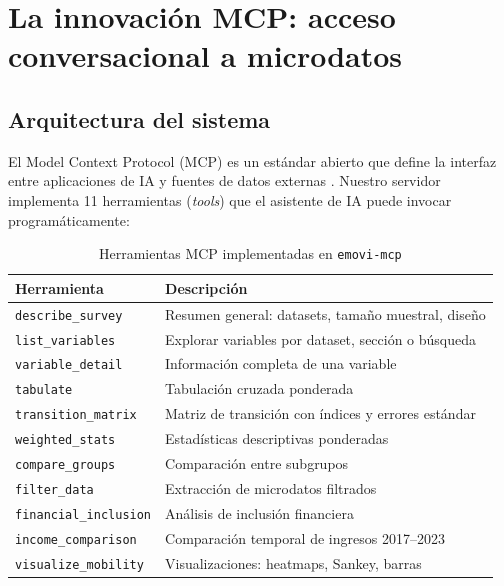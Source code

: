 \documentclass[12pt, a4paper]{article}
\begin{document}
% 


\section{La innovación MCP: acceso conversacional a microdatos}
\label{sec:mcp}

\subsection{Arquitectura del sistema}

El Model Context Protocol (MCP) es un estándar abierto que define la interfaz entre aplicaciones de IA y fuentes de datos externas \citep{anthropic2024mcp}. Nuestro servidor implementa 11 herramientas (\textit{tools}) que el asistente de IA puede invocar programáticamente:

\begin{table}[H]
\centering
\small
\caption{Herramientas MCP implementadas en \texttt{emovi-mcp}}
\label{tab:tools}
\begin{tabularx}{\textwidth}{lX}
\toprule
\textbf{Herramienta} & \textbf{Descripción} \\
\midrule
\texttt{describe\_survey} & Resumen general: datasets, tamaño muestral, diseño \\
\texttt{list\_variables} & Explorar variables por dataset, sección o búsqueda \\
\texttt{variable\_detail} & Información completa de una variable \\
\texttt{tabulate} & Tabulación cruzada ponderada \\
\texttt{transition\_matrix} & Matriz de transición con índices y errores estándar \\
\texttt{weighted\_stats} & Estadísticas descriptivas ponderadas \\
\texttt{compare\_groups} & Comparación entre subgrupos \\
\texttt{filter\_data} & Extracción de microdatos filtrados \\
\texttt{financial\_inclusion} & Análisis de inclusión financiera \\
\texttt{income\_comparison} & Comparación temporal de ingresos 2017--2023 \\
\texttt{visualize\_mobility} & Visualizaciones: heatmaps, Sankey, barras \\
\bottomrule
\end{tabularx}
\end{table}
\end{document}
